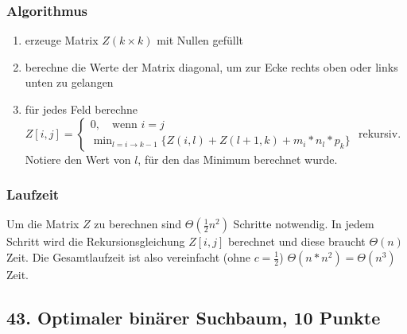 \documentclass[ngerman,a4paper]{report}
\begin{document}
\subsubsection*{Algorithmus}
\begin{enumerate}
\item erzeuge Matrix $Z (k \times k)$ mit Nullen gefüllt
\item berechne die Werte der Matrix diagonal, um zur Ecke rechts oben oder links unten zu gelangen 
\item für jedes Feld berechne $Z[i,j] = \begin{cases} 0, \quad\text{wenn } i = j \\ \min_{l = i \rightarrow k-1}\{Z(i,l) + Z(l+1,k) + m_i * n_l * p_k \}\end{cases}$ rekursiv. Notiere den Wert von $l$, für den das Minimum berechnet wurde.
\end{enumerate}
\subsubsection*{Laufzeit}
Um die Matrix $Z$ zu berechnen sind $\Theta(\frac{1}{2}n^2)$ Schritte notwendig. In jedem Schritt wird die Rekursionsgleichung $Z[i,j]$ berechnet und diese braucht $\Theta(n)$ Zeit. Die Gesamtlaufzeit ist also vereinfacht (ohne $c=\frac{1}{2}$) $\Theta(n*n^2) = \Theta(n^3)$ Zeit.
\subsection*{43. Optimaler binärer Suchbaum, 10 Punkte}
\end{document}
